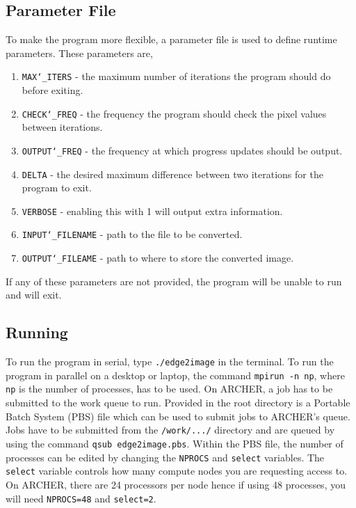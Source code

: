\documentclass[11pt, a4paper]{article}
\begin{document}
		\subsection{Parameter File}
			To make the program more flexible, a parameter file is used to define runtime parameters. These parameters are,
				
				\begin{enumerate}
					\item \texttt{MAX\char`_ITERS} - the maximum number of iterations the program should do before exiting.
					\item \texttt{CHECK\char`_FREQ} - the frequency the program should check the pixel values between iterations.
					\item \texttt{OUTPUT\char`_FREQ} - the frequency at which progress updates should be output.
					\item \texttt{DELTA} - the desired maximum difference between two iterations for the program to exit.
					\item \texttt{VERBOSE} - enabling this with 1 will output extra information.
					\item \texttt{INPUT\char`_FILENAME} - path to the file to be converted.
					\item \texttt{OUTPUT\char`_FILEAME} - path to where to store the converted image.
				\end{enumerate}
			
			\noindent If any of these parameters are not provided, the program will be unable to run and will exit. 
	
		\subsection{Running}
			To run the program in serial, type \texttt{./edge2image} in the terminal. To run the program in parallel on a desktop or laptop, the command \texttt{mpirun -n np}, where \texttt{np} is the number of processes, has to be used. On ARCHER, a job has to be submitted to the work queue to run. Provided in the root directory is a Portable Batch System (PBS) file which can be used to submit jobs to ARCHER's queue. Jobs have to be submitted from the \texttt{/work/.../} directory and are queued by using the command \texttt{qsub edge2image.pbs}. Within the PBS file, the number of processes can be edited by changing the \texttt{NPROCS} and \texttt{select} variables. The \texttt{select} variable controls how many compute nodes you are requesting access to. On ARCHER, there are 24 processors per node hence if using 48 processes, you will need \texttt{NPROCS=48} and \texttt{select=2}.
			
\end{document}
